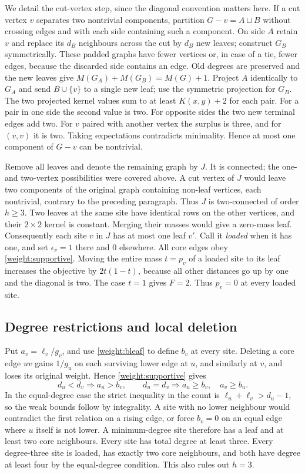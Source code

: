 We detail the cut-vertex step, since the diagonal convention matters here. If a cut vertex $v$ separates two nontrivial components, partition $G-v=A\sqcup B$ without crossing edges and with each side containing such a component. On side $A$ retain $v$ and replace its $d_B$ neighbours across the cut by $d_B$ new leaves; construct $G_B$ symmetrically. These padded graphs have fewer vertices or, in case of a tie, fewer edges, because the discarded side contains an edge. Old degrees are preserved and the new leaves give $M(G_A)+M(G_B)=M(G)+1$. Project $A$ identically to $G_A$ and send $B\cup\{v\}$ to a single new leaf; use the symmetric projection for $G_B$. The two projected kernel values sum to at least $K(x,y)+2$ for each pair. For a pair in one side the second value is two. For opposite sides the two new terminal edges add two. For $v$ paired with another vertex the surplus is three, and for $(v,v)$ it is two. Taking expectations contradicts minimality. Hence at most one component of $G-v$ can be nontrivial.

Remove all leaves and denote the remaining graph by $J$. It is connected; the one- and two-vertex possibilities were covered above. A cut vertex of $J$ would leave two components of the original graph containing non-leaf vertices, each nontrivial, contrary to the preceding paragraph. Thus $J$ is two-connected of order $h\ge3$. Two leaves at the same site have identical rows on the other vertices, and their $2\times2$ kernel is constant. Merging their masses would give a zero-mass leaf. Consequently each site $v$ in $J$ has at most one leaf $v'$. Call it \emph{loaded} when it has one, and set $\epsilon_v=1$ there and $0$ elsewhere. All core edges obey \eqref{weight:supportive}. Moving the entire mass $t=p_v$ of a loaded site to its leaf increases the objective by $2t(1-t)$, because all other distances go up by one and the diagonal is two. The case $t=1$ gives $F=2$. Thus $p_v=0$ at every loaded site.
\subsection{Degree restrictions and local deletion}
Put $a_v=\ell_v/g_v$, and use \eqref{weight:bleaf} to define $b_v$ at every site. Deleting a core edge $uv$ gains $1/g_u$ on each surviving lower edge at $u$, and similarly at $v$, and loses its original weight. Hence \eqref{weight:supportive} gives
\[
 d_u<d_v\Longrightarrow a_u>b_v,\qquad
 d_u=d_v\Longrightarrow a_u\ge b_v,\quad a_v\ge b_u .
\]
In the equal-degree case the strict inequality in the count is $\ell_u+\ell_v>d_u-1$, so the weak bounds follow by integrality. A site with no lower neighbour would contradict the first relation on a rising edge, or force $b_v=0$ on an equal edge where $u$ itself is not lower. A minimum-degree site therefore has a leaf and at least two core neighbours. Every site has total degree at least three. Every degree-three site is loaded, has exactly two core neighbours, and both have degree at least four by the equal-degree condition. This also rules out $h=3$.

